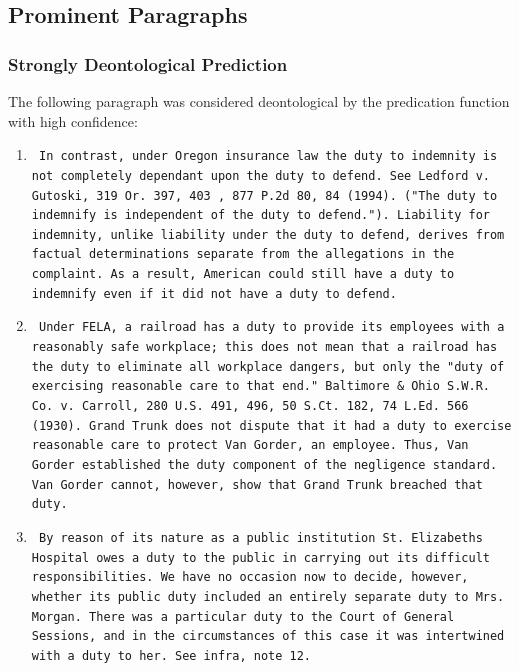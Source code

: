 \documentclass{article}
\begin{document}
\subsection{Prominent Paragraphs}

\subsubsection{Strongly Deontological Prediction}
The following paragraph was considered deontological by the predication function with high confidence: \newline

\begin{enumerate}
    \item 
\texttt{
In contrast, under Oregon insurance law the duty to indemnity is not completely dependant upon the duty to defend. See Ledford v. Gutoski, 319 Or. 397, 403 , 877 P.2d 80, 84 (1994). ("The duty to indemnify is independent of the duty to defend."). Liability for indemnity, unlike liability under the duty to defend, derives from factual determinations separate from the allegations in the complaint. As a result, American could still have a duty to indemnify even if it did not have a duty to defend.
}
    \item
\texttt{
Under FELA, a railroad has a duty to provide its employees with a reasonably safe workplace; this does not mean that a railroad has the duty to eliminate all workplace dangers, but only the "duty of exercising reasonable care to that end." Baltimore & Ohio S.W.R. Co. v. Carroll, 280 U.S. 491, 496, 50 S.Ct. 182, 74 L.Ed. 566 (1930). Grand Trunk does not dispute that it had a duty to exercise reasonable care to protect Van Gorder, an employee. Thus, Van Gorder established the duty component of the negligence standard. Van Gorder cannot, however, show that Grand Trunk breached that duty.
}
    \item
\texttt{
By reason of its nature as a public institution St. Elizabeths Hospital owes a duty to the public in carrying out its difficult responsibilities. We have no occasion now to decide, however, whether its public duty included an entirely separate duty to Mrs. Morgan. There was a particular duty to the Court of General Sessions, and in the circumstances of this case it was intertwined with a duty to her. See infra, note 12.
}
    
    
\end{enumerate}
\end{document}
